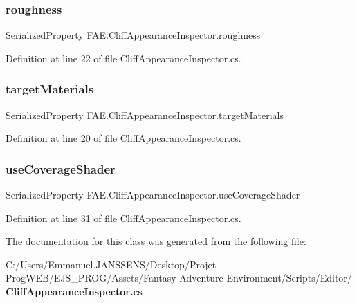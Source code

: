 \subsubsection{roughness}
{\footnotesize\ttfamily Serialized\+Property F\+A\+E.\+Cliff\+Appearance\+Inspector.\+roughness}



Definition at line 22 of file Cliff\+Appearance\+Inspector.\+cs.

\mbox{\label{class_f_a_e_1_1_cliff_appearance_inspector_a76ec8044865f14de6c39f33e5fde7184}} 
\subsubsection{target\+Materials}
{\footnotesize\ttfamily Serialized\+Property F\+A\+E.\+Cliff\+Appearance\+Inspector.\+target\+Materials}



Definition at line 20 of file Cliff\+Appearance\+Inspector.\+cs.

\mbox{\label{class_f_a_e_1_1_cliff_appearance_inspector_a915f39561ad5456b835ad0c21bab9842}} 
\subsubsection{use\+Coverage\+Shader}
{\footnotesize\ttfamily Serialized\+Property F\+A\+E.\+Cliff\+Appearance\+Inspector.\+use\+Coverage\+Shader}



Definition at line 31 of file Cliff\+Appearance\+Inspector.\+cs.



The documentation for this class was generated from the following file\+:\begin{DoxyCompactItemize}
\item 
C\+:/\+Users/\+Emmanuel.\+J\+A\+N\+S\+S\+E\+N\+S/\+Desktop/\+Projet Prog\+W\+E\+B/\+E\+J\+S\+\_\+\+P\+R\+O\+G/\+Assets/\+Fantasy Adventure Environment/\+Scripts/\+Editor/\textbf{ Cliff\+Appearance\+Inspector.\+cs}\end{DoxyCompactItemize}
